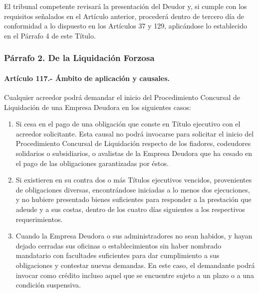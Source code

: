 \documentclass[
]{book}
\begin{document}
El tribunal competente revisará la presentación del Deudor y, si cumple con los requisitos señalados en el Artículo anterior, procederá dentro de tercero día de conformidad a lo dispuesto en los Artículos 37 y 129, aplicándose lo establecido en el Párrafo 4 de este Título.

\hypertarget{puxe1rrafo-2.-de-la-liquidaciuxf3n-forzosa}{%
\subsubsection*{Párrafo 2. De la Liquidación Forzosa}\label{puxe1rrafo-2.-de-la-liquidaciuxf3n-forzosa}}

\hypertarget{artuxedculo-117.--uxe1mbito-de-aplicaciuxf3n-y-causales.}{%
\paragraph*{Artículo 117.- Ámbito de aplicación y causales.}\label{artuxedculo-117.--uxe1mbito-de-aplicaciuxf3n-y-causales.}}

Cualquier acreedor podrá demandar el inicio del Procedimiento Concursal de Liquidación de una Empresa Deudora en los siguientes casos:

\begin{enumerate}
\def\labelenumi{\arabic{enumi})}
\item
  Si cesa en el pago de una obligación que conste en Título ejecutivo con el acreedor solicitante. Esta causal no podrá invocarse para solicitar el inicio del Procedimiento Concursal de Liquidación respecto de los fiadores, codeudores solidarios o subsidiarios, o avalistas de la Empresa Deudora que ha cesado en el pago de las obligaciones garantizadas por éstos.
\item
  Si existieren en su contra dos o más Títulos ejecutivos vencidos, provenientes de obligaciones diversas, encontrándose iniciadas a lo menos dos ejecuciones, y no hubiere presentado bienes suficientes para responder a la prestación que adeude y a sus costas, dentro de los cuatro días siguientes a los respectivos requerimientos.
\item
  Cuando la Empresa Deudora o sus administradores no sean habidos, y hayan dejado cerradas sus oficinas o establecimientos sin haber nombrado mandatario con facultades suficientes para dar cumplimiento a sus obligaciones y contestar nuevas demandas. En este caso, el demandante podrá invocar como crédito incluso aquel que se encuentre sujeto a un plazo o a una condición suspensiva.
\end{enumerate}
\end{document}
